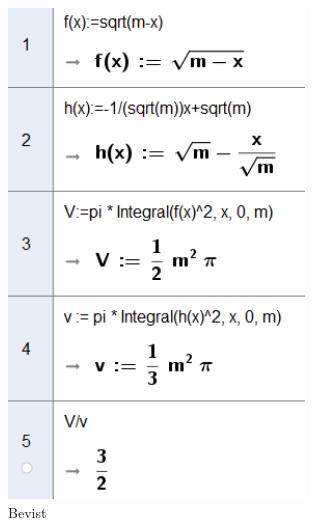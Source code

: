\documentclass{article}
\begin{document}
\begin{figure}[h]
    \centering
    \includegraphics[width=0.7\textwidth]{oppgave12.png}
    \caption{Bevist}
    \label{fig:geogebra}
\end{figure}



\end{document}
